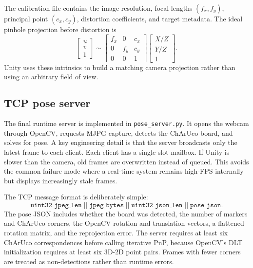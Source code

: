 \documentclass[10pt,twocolumn,letterpaper]{article}
\begin{document}
The calibration file contains the image resolution, focal lengths
$(f_x, f_y)$, principal point $(c_x, c_y)$, distortion coefficients, and target
metadata.  The ideal pinhole projection before distortion is
\begin{equation}
    \begin{bmatrix} u \\ v \\ 1 \end{bmatrix}
    \sim
    \begin{bmatrix}
    f_x & 0 & c_x \\
    0 & f_y & c_y \\
    0 & 0 & 1
    \end{bmatrix}
    \begin{bmatrix} X/Z \\ Y/Z \\ 1 \end{bmatrix}.
\end{equation}
Unity uses these intrinsics to build a matching camera projection rather than
using an arbitrary field of view.

\subsection{TCP pose server}

The final runtime server is implemented in \texttt{pose\_server.py}.  It opens
the webcam through OpenCV, requests MJPG capture, detects the ChArUco board, and
solves for pose.  A key engineering detail is that the server broadcasts only
the latest frame to each client.  Each client has a single-slot mailbox.  If
Unity is slower than the camera, old frames are overwritten instead of queued.
This avoids the common failure mode where a real-time system remains high-FPS
internally but displays increasingly stale frames.

The TCP message format is deliberately simple:
\begin{equation}
\texttt{uint32 jpeg\_len} \; || \; \texttt{jpeg bytes} \; || \;
\texttt{uint32 json\_len} \; || \; \texttt{pose json}.
\end{equation}
The pose JSON includes whether the board was detected, the number of markers
and ChArUco corners, the OpenCV rotation and translation vectors, a flattened
rotation matrix, and the reprojection error.  The server requires at least six
ChArUco correspondences before calling iterative PnP, because OpenCV's DLT
initialization requires at least six 3D-2D point pairs.  Frames with fewer
corners are treated as non-detections rather than runtime errors.
\end{document}
